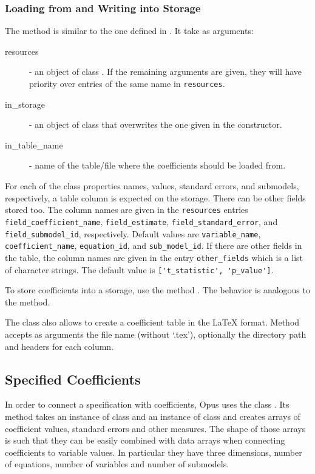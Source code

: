 {\subsubsection{Loading from and Writing into Storage}
%
The method  is similar to the one defined in
. It take as arguments:
\begin{description}
\item[resources] - an object of class . If the remaining
  arguments are given, they will have priority over entries of the same name
  in \verb|resources|.
\item[in_storage] -  an object of class  that overwrites the
  one given in the constructor.
\item[in_table_name] - name of the table/file where the coefficients \coefficientsindex should
  be loaded from.
\end{description}
For each of the class properties names, values, standard errors, and
submodels, respectively, a table column is expected on the storage. There can
be other fields stored too. The column names are given in the \verb|resources|
entries \verb|field_coefficient_name|, \coefficientsindex \verb|field_estimate|,
\verb|field_standard_error|, and \verb|field_submodel_id|, respectively. Default
values are \verb|variable_name|, \variablesindex \verb|coefficient_name|, \coefficientsindex \verb|equation_id|, and
\verb|sub_model_id|. If there are other fields in the table, the column names are
given in the entry \verb|other_fields| which is a list of character strings. The
default value is \verb|['t_statistic', 'p_value']|.

To store coefficients \coefficientsindex into a storage, use the method
. The behavior is
analogous to the  method.

The class also allows to create a coefficient \coefficientsindex table in the \LaTeX
format. Method  accepts as arguments the file name
(without `.tex'), optionally the directory path and headers for each column.

\subsection{Specified Coefficients}
\label{sec:specified-coefficients}
%
In order to connect a specification with coefficients, \coefficientsindex Opus uses the class
. Its method  takes an instance
of class  and an instance of class
 and creates arrays of coefficient \coefficientsindex values,
standard errors and other measures. The shape of those arrays is such that
they can be easily combined with data arrays when connecting coefficients \coefficientsindex to
variable \variablesindex values. In particular they have three dimensions, number of
equations, number of variables \variablesindex and number of submodels.

}
